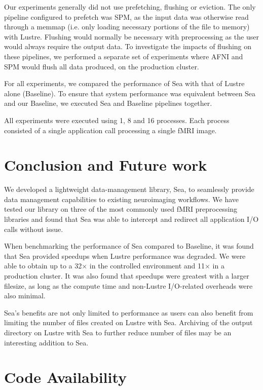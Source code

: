 \documentclass[fleqn,10pt]{wlscirep}
\begin{document}
    Our experiments generally did not use prefetching, flushing or eviction. The
    only pipeline configured to prefetch was SPM, as the input data was otherwise
    read through a memmap (i.e. only loading necessary portions of the file to memory) 
    with Lustre. Flushing would normally be necessary with
    preprocessing as the user would always require the output data. To
    investigate the impacts of flushing on these pipelines, we performed a
    separate set of experiments where AFNI and SPM would flush all data
    produced, on the production cluster.

    For all experiments, we compared the performance of Sea with that of Lustre
    alone (Baseline). To ensure that system performance was equivalent between
    Sea and our Baseline, we executed Sea and Baseline pipelines together.
    
    All experiments were executed using 1, 8 and 16 processes.
    Each process consisted of a single application call processing a single fMRI image.
    
    \section{Conclusion and Future work}

    We developed a lightweight data-management library, Sea, to seamlessly
    provide data management capabilities to existing neuroimaging workflows. We
    have tested our library on three of the most commonly used fMRI
    preprocessing libraries and found that Sea was able to intercept and
    redirect all application I/O calls without issue. 

    When benchmarking the performance of Sea compared to Baseline, it was found that Sea provided speedups
    when Lustre performance was degraded. We were able to obtain up to a
    32$\times$ in the controlled environment and 11$\times$ in a production
    cluster. It was also found that speedups were greatest with a larger
    filesize, as long as the compute time and non-Lustre I/O-related overheads
    were also minimal.

    Sea's benefits are not only limited to performance as
    users can also benefit from limiting the number of files created on Lustre
    with Sea. Archiving of the output directory on Lustre with Sea to further
    reduce number of files may be an interesting addition to Sea.

    \section{Code Availability}
\end{document}
